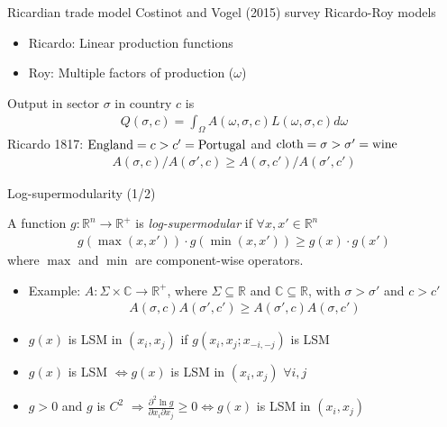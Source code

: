 \documentclass[10pt,notes=hide]{beamer}
\begin{document}
\begin{frame}{Ricardian trade model}
Costinot and Vogel (2015) survey Ricardo-Roy models
\begin{itemize}
	\item Ricardo: Linear production functions
	\item Roy: Multiple factors of production ($\omega$)
\end{itemize}
Output in sector $\sigma$ in country $c$ is
\begin{align*}
Q(\sigma,c)=\int_{\Omega} A(\omega,\sigma,c) L(\omega,\sigma,c)d\omega
\end{align*}
Ricardo 1817: $\textnormal{England}=c>c'=\textnormal{Portugal}$ and $\textnormal{cloth}=\sigma>\sigma'=\textnormal{wine}$
\begin{align*}
A(\sigma,c) / A(\sigma',c) \geq A(\sigma,c') / A(\sigma',c')
\end{align*}
\end{frame}
\begin{frame}{Log-supermodularity (1/2)}
\begin{definition}
A function $g:\mathbb{R}^n\to\mathbb{R}^{+}$ is \emph{log-supermodular} if $\forall x,x'\in\mathbb{R}^n$
\begin{align*}
g\left(\max\left(x,x'\right)\right)\cdot g\left(\min\left(x,x'\right)\right)\geq g(x)\cdot g(x')
\end{align*}
where $\max$ and $\min$ are component-wise operators.
\end{definition}
\begin{itemize}
	\item Example: $A: \Sigma\times\mathbb{C}\to\mathbb{R}^{+}$, where $\Sigma\subseteq\mathbb{R}$ and $\mathbb{C}\subseteq\mathbb{R}$, with $\sigma>\sigma'$ and $c>c'$
		\begin{align*}
		A(\sigma,c)A(\sigma',c')\geq A(\sigma',c)A(\sigma,c')
		\end{align*}
	\item $g(x)$ is LSM in $(x_i,x_j)$ if $g(x_i,x_j;x_{-i,-j})$ is LSM 
	\item $g(x)$ is LSM $\iff g(x)$ is LSM in $(x_i,x_j)$  $\forall i,j$
	\item $g>0$ and $g$ is $C^2$ $\Rightarrow \frac{\partial^2 \ln g}{\partial x_i \partial x_j}\geq 0 \iff g(x)$ is LSM in $(x_i,x_j)$
\end{itemize}

\end{frame}
\end{document}
